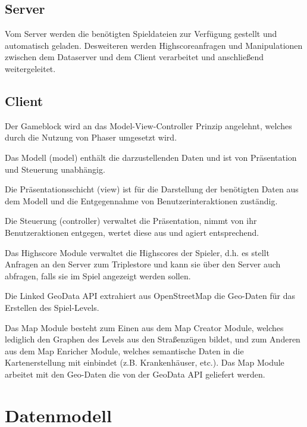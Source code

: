\documentclass[11pt,a4paper]{article}
\begin{document}
\subsection{Server} Vom Server werden die benötigten Spieldateien zur Verfügung gestellt und automatisch geladen. Desweiteren werden Highscoreanfragen und Manipulationen zwischen dem Dataserver und dem Client verarbeitet und anschließend weitergeleitet.

\subsection{Client}
Der Gameblock wird an das Model-View-Controller Prinzip angelehnt, welches durch die Nutzung von Phaser umgesetzt wird. \bigskip

Das Modell (model) enthält die darzustellenden Daten und ist von Präsentation und Steuerung unabhängig.\bigskip

Die Präsentationsschicht (view) ist für die Darstellung der benötigten Daten aus dem Modell und die Entgegennahme von Benutzerinteraktionen zuständig.\bigskip

Die Steuerung (controller) verwaltet die Präsentation, nimmt von ihr Benutzeraktionen entgegen, wertet diese aus und agiert entsprechend.\bigskip

Das Highscore Module verwaltet die Highscores der Spieler, d.h. es stellt Anfragen an den Server zum Triplestore und kann sie über den Server auch abfragen, falls sie im Spiel angezeigt werden sollen.\bigskip

Die Linked GeoData API extrahiert aus OpenStreetMap die Geo-Daten für das Erstellen des Spiel-Levels.\bigskip

Das Map Module besteht zum Einen aus dem Map Creator Module, welches lediglich den Graphen des Levels aus den Straßenzügen bildet, und zum Anderen aus dem Map Enricher Module, welches semantische Daten in die Kartenerstellung mit einbindet (z.B. Krankenhäuser, etc.). Das Map Module arbeitet mit den Geo-Daten die von der GeoData API geliefert werden.


\section{Datenmodell}
\end{document}
